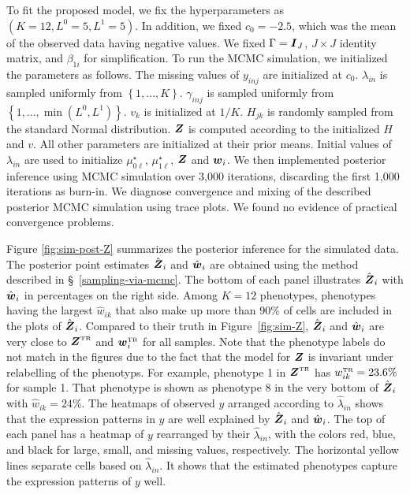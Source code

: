 \documentclass[12pt,]{article}
\newcommand{\bc}[1]{ \left\{#1\right\} }
\def\Z{\bm{Z}}
\newcommand{\true}{{\mbox{\tiny TR}}}
\newcommand{\bZ}{\mbox{\boldmath $Z$}}
\newcommand{\bw}{\mbox{\boldmath $w$}}
\newcommand{\bI}{\mbox{\boldmath $I$}}
\begin{document}
To fit the proposed model, we fix the hyperparameters as $(K=12, L^0=5,
L^1=5)$. In addition, we fixed $c_0=-2.5$, which was the mean of the observed
data having negative values.  We fixed $\Gamma=\bI_J$, $J\times J$ identity
matrix, and $\beta_{1i}$ for simplification. To run the MCMC simulation, we
initialized the parameters as follows. The missing values of $y_{inj}$ are
initialized at $c_0$.  $\lambda_{in}$ is sampled uniformly from $\bc{1,...,K}$.
$\gamma_{inj}$ is sampled uniformly from $\bc{1,...,\min(L^0,L^1)}$. $v_k$ is
initialized at $1/K$. $H_{jk}$ is randomly sampled from the standard Normal
distribution.  $\bZ$ is computed according to the initialized $H$ and $v$. All
other parameters are initialized at their prior means.  Initial values of
$\lambda_{in}$ are used to initialize $\mu^{\star}_{0\ell}$,
$\mu^{\star}_{1\ell}$, $\bZ$ and $\bw_i$.  We then implemented posterior
inference using MCMC simulation over 3,000 iterations, discarding the first
1,000 iterations as burn-in.  We diagnose convergence and mixing of the
described posterior MCMC simulation using trace plots. We found no evidence of
practical convergence problems. 


Figure \ref{fig:sim-post-Z} summarizes the posterior inference for the
simulated data.  The posterior point estimates $\hat{\bZ}_i$ and $\hat{\bw}_i$
are obtained using the method described in \S~\ref{sampling-via-mcmc}.  
%
The bottom of each panel illustrates $\hat{\bZ}_i$ with $\hat{\bw}_i$ in
percentages on the right side. Among $K=12$ phenotypes, phenotypes having the
largest $\hat{w}_{ik}$ that also make up more than 90\% of cells are included
in the plots of $\hat{\bZ}_i$. Compared to their truth in Figure~\ref{fig:sim-Z},
$\hat{\bZ}_i$ and $\hat{\bw}_i$ are very close to $\bZ^\true$ and $\bw_i^\true$
for all samples. Note that the phenotype labels do not match in the figures due
to the fact that the model for $\bZ$ is invariant under relabelling of the
phenotyps. For example, phenotype 1 in $\bZ^\true$ has $w^\true_{ik}=23.6\%$
for sample 1.  That phenotype is shown as phenotype 8 in the very bottom of
$\hat{\bZ}_i$ with $\hat{w}_{ik}=24\%$.
The heatmaps of observed $y$ arranged according to $\hat{\lambda}_{in}$ shows
that the expression patterns in $y$ are well explained by $\hat{\bZ}_i$ and
$\hat{\bw}_i$.  The top of each panel has a heatmap of $y$ rearranged by their
$\hat{\lambda}_{in}$, with the colors red, blue, and black for large, small, and
missing values, respectively.  The horizontal yellow lines separate cells based
on $\hat{\lambda}_{in}$.  It shows that the estimated phenotypes capture the
expression patterns of $y$ well.
\end{document}
